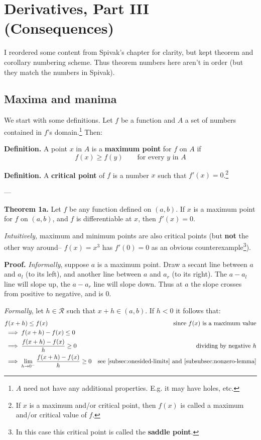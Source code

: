 
\section{Derivatives, Part III (Consequences)}

I reordered some content from Spivak's chapter for clarity, but kept
theorem and corollary numbering scheme. Thus theorem numbers here
aren't in order (but they match the numbers in Spivak).

\subsection{Maxima and manima}
We start with some definitions. Let $f$ be a function and $A$ a set of
numbers contained in $f$'s domain.\footnote{$A$ need not have any
  additional properties. E.g. it may have holes, etc.} Then:

\vs

\textbf{Definition.} A point $x$ in $A$ is a \textbf{maximum
  point} for $f$ on $A$ if
\[f(x)\geq f(y)\qquad\text{for every $y$ in $A$}\]

\textbf{Definition.} A \textbf{critical point} of $f$ is a number $x$
such that $f'(x)=0$.\footnote{If $x$ is a maximum and/or critical
  point, then $f(x)$ is called a maximum and/or critical value of
  $f$.}

\vs---\vs

\textbf{Theorem 1a.} Let $f$ be any function defined on $(a,b)$. If $x$
is a maximum point for $f$ on $(a,b)$, and $f$ is differentiable at
$x$, then $f'(x)=0$.

\vs

\textit{Intuitively,} maximum and minimum points are also critical
points (but \textbf{not} the other way around-- $f(x)=x^3$ has
$f'(0)=0$ as an obvious counterexample\footnote{In this case this
  critical point is called the \textbf{saddle point}.}).

\vs

\textbf{Proof.} \textit{Informally}, suppose $a$ is a maximum point.
Draw a secant line between $a$ and $a_l$ (to its left), and another
line between $a$ and $a_r$ (to its right). The $a-a_l$ line will slope
up, the $a-a_r$ line will slope down. Thus at $a$ the slope crosses
from positive to negative, and is $0$.

\vs

\textit{Formally}, let $h\in\mathcal{R}$ such that $x+h\in(a,b)$. If $h<0$ it follows that:
\begin{align*}
  &f(x+h)\leq f(x)&\text{since $f(x)$ is a maximum value}\\
  &\implies f(x+h)-f(x)\leq 0\\
  &\implies\frac{f(x+h)-f(x)}{h}\geq0&\text{dividing by negative $h$}\\
  &\implies \lim_{h\to0^-}\frac{f(x+h)-f(x)}{h}\geq0&\text{see
                                                 \ref{subsec:onesided-limits}
                                                 and
                                                 \ref{subsubsec:nonzero-lemma}}
\end{align*}

